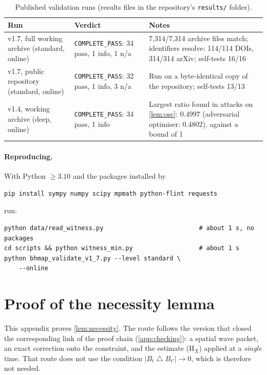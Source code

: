 \documentclass[11pt]{article}
\theoremstyle{plain}
\theoremstyle{definition}
\theoremstyle{remark}
\begin{document}
\begin{table}[ht]
\centering
\caption{Published validation runs (results files in the repository's \texttt{results/} folder).}
\label{tab:validation}
\small
\renewcommand{\arraystretch}{1.2}
\begin{tabular}{@{}P{3.6cm} P{3.4cm} P{6.4cm}@{}}
\toprule
Run & Verdict & Notes \\
\midrule
v1.7, full working archive (standard, online) & \texttt{COMPLETE\_PASS}: 34 pass, 1 info, 1 n/a & 7{,}314/7{,}314 archive files match; identifiers resolve: 114/114 DOIs, 314/314 arXiv; self-tests 16/16 \\
v1.7, public repository (standard, online) & \texttt{COMPLETE\_PASS}: 32 pass, 1 info, 3 n/a & Run on a byte-identical copy of the repository; self-tests 13/13 \\
v1.4, working archive (deep, online) & \texttt{COMPLETE\_PASS}: 34 pass, 1 info & Largest ratio found in attacks on \cref{lem:osc}: $0.4997$ (adversarial optimiser: $0.4802$), against a bound of 1 \\
\bottomrule
\end{tabular}
\end{table}

\paragraph{Reproducing.}
With Python $\ge 3.10$ and the packages installed by
\begin{verbatim}
pip install sympy numpy scipy mpmath python-flint requests
\end{verbatim}
run:
\begin{verbatim}
python data/read_witness.py                          # about 1 s, no packages
cd scripts && python witness_min.py                  # about 1 s
python bhmap_validate_v1_7.py --level standard \
    --online
\end{verbatim}

\section{Proof of the necessity lemma}\label{app:r1}

This appendix proves \cref{lem:necessity}. The route follows the version that closed the corresponding link of the proof chain (\cref{app:checking}): a spatial wave packet, an exact correction onto the constraint, and the estimate (H$_X$) applied at a \emph{single} time. That route does not use the condition $|B_t \mathbin{\triangle} B_{t'}| \to 0$, which is therefore not needed.
\end{document}

